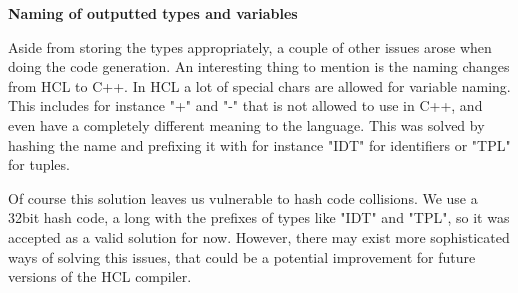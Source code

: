 \textbf{Naming of outputted types and variables}

Aside from storing the types appropriately, a couple of other issues arose when doing the code generation.
An interesting thing to mention is the naming changes from HCL to C++.
In HCL a lot of special chars are allowed for variable naming. 
This includes for instance "+" and "-" that is not allowed to use in C++, and even have a completely different meaning to the language.
This was solved by hashing the name and prefixing it with for instance "IDT" for identifiers or "TPL" for tuples.

Of course this solution leaves us vulnerable to hash code collisions.
We use a 32bit hash code, a long with the prefixes of types like "IDT" and "TPL", so it was accepted as a valid solution for now.
However, there may exist more sophisticated ways of solving this issues, that could be a potential improvement for future versions of the HCL compiler. 
